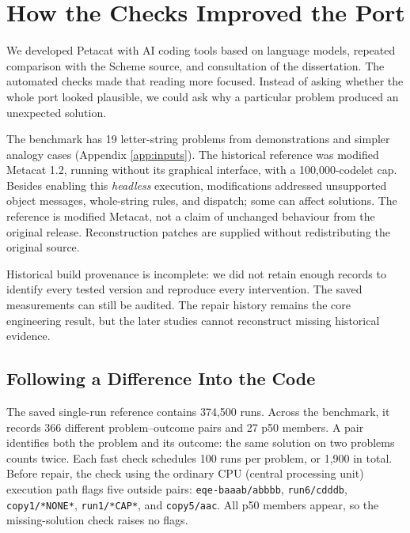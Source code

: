 \documentclass[10pt,letterpaper]{article}
\begin{document}
\section{How the Checks Improved the Port}\label{sec:case}

We developed Petacat with AI coding tools based on language models, repeated comparison
with the Scheme source, and consultation of the dissertation. The automated checks made
that reading more focused. Instead of asking whether the whole port looked plausible, we
could ask why a particular problem produced an unexpected solution.

The benchmark has 19 letter-string problems from demonstrations and simpler analogy cases
(Appendix \ref{app:inputs}). The historical reference was modified Metacat 1.2, running
without its graphical interface, with a 100,000-codelet cap. Besides enabling this
\emph{headless} execution, modifications addressed unsupported object messages,
whole-string rules, and dispatch; some can affect solutions. The reference is modified
Metacat, not a claim of unchanged behaviour from the original release. Reconstruction
patches are supplied without redistributing the original source.

Historical build provenance is incomplete: we did not retain enough records to identify
every tested version and reproduce every intervention. The saved measurements can still be
audited. The repair history remains the core engineering result, but the later studies
cannot reconstruct missing historical evidence.

\subsection{Following a Difference Into the Code}\label{sec:results}

The saved single-run reference contains 374,500 runs. Across the benchmark, it records 366
different problem--outcome pairs and 27 p50 members. A pair identifies both the problem
and its outcome: the same solution on two problems counts twice. Each fast check schedules
100 runs per problem, or 1,900 in total. Before repair, the check using the ordinary CPU
(central processing unit) execution path flags five outside pairs:
\texttt{eqe-baaab/abbbb}, \texttt{run6/cdddb}, \texttt{copy1/*NONE*}, \texttt{run1/*CAP*},
and \texttt{copy5/aac}. All p50 members appear, so the missing-solution check raises no
flags.


\end{document}
